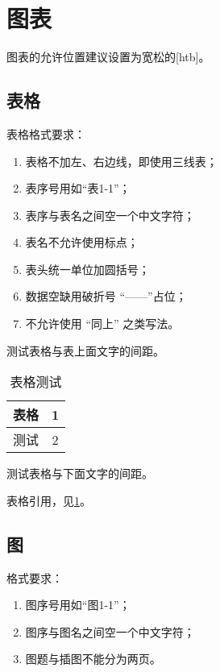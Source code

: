 \section{图表}

图表的允许位置建议设置为宽松的[htb]。

\subsection{表格}

表格格式要求：

\begin{enumerate}
	\item 表格不加左、右边线，即使用三线表；
	\item	表序号用如``表1-1''；
	\item 表序与表名之间空一个中文字符；
	\item 表名不允许使用标点；
	\item 表头统一单位加圆括号；
	\item 数据空缺用破折号 ``——''占位；
	\item 不允许使用 ``同上'' 之类写法。
\end{enumerate}

测试表格与表上面文字的间距。

\begin{table}[htb]
	\centering
	\caption{表格测试}
	\label{tab:a}
	\begin{tabular}{cc}
		\toprule
		表格 & 1  \\
		\midrule
		测试 & 2  \\
		\bottomrule
	\end{tabular}
\end{table}

测试表格与下面文字的间距。

表格引用，见\cref{tab:a}。

\subsection{图}

格式要求：

\begin{enumerate}
	\item	图序号用如``图1-1''；
	\item 图序与图名之间空一个中文字符；
	\item 图题与插图不能分为两页。
\end{enumerate}

